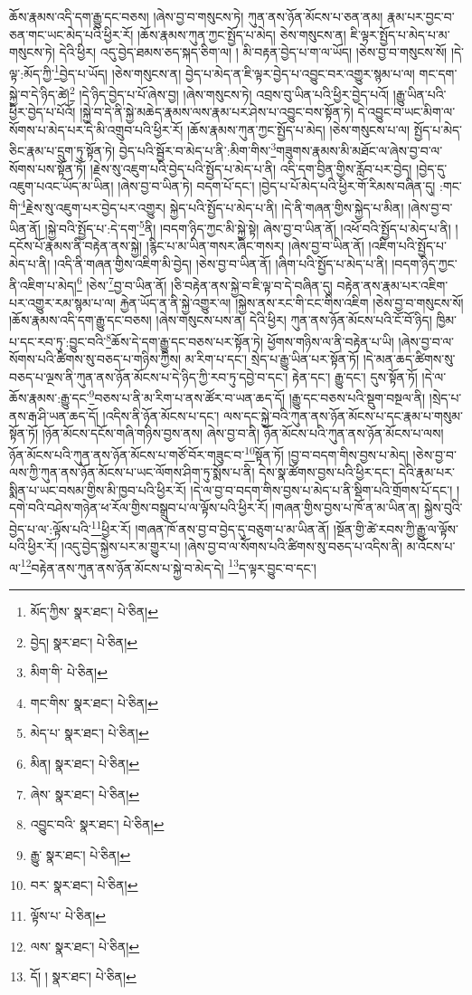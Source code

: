 ཆོས་རྣམས་འདི་དག་རྒྱུ་དང་བཅས། །ཞེས་བྱ་བ་གསུངས་ཏེ། ཀུན་ནས་ཉོན་མོངས་པ་ཅན་ནམ། རྣམ་པར་བྱང་བ་ཅན་གང་ཡང་མེད་པའི་ཕྱིར་རོ། །ཆོས་རྣམས་ཀུན་ཀྱང་སྤྱོད་པ་མེད། ཅེས་གསུངས་ན། ཇི་ལྟར་སྤྱོད་པ་མེད་པ་མ་གསུངས་ཏེ། དེའི་ཕྱིར། འདུ་བྱེད་ཐམས་ཅད་སྐད་ཅིག་ལ། །
མི་བརྟན་བྱེད་པ་ག་ལ་ཡོད། །ཅེས་བྱ་བ་གསུངས་སོ། །དེ་ལྟ་:མོད་ཀྱི་\footnote{མོད་ཀྱིས་  སྣར་ཐང་།  པེ་ཅིན། }བྱེད་པ་ཡོད། །ཅེས་གསུངས་ན། བྱེད་པ་མེད་ན་ཇི་ལྟར་བྱེད་པ་འབྱུང་བར་འགྱུར་སྙམ་པ་ལ། གང་དག་སྐྱེ་བ་དེ་ཉིད་ཚེ།\footnote{བྱེད།  སྣར་ཐང་།  པེ་ཅིན། } །དེ་ཉིད་བྱེད་པ་པོ་ཞེས་བྱ། །ཞེས་གསུངས་ཏེ། འབྲས་བུ་ཡིན་པའི་ཕྱིར་བྱེད་པའོ། །རྒྱུ་ཡིན་པའི་ཕྱིར་བྱེད་པ་པོའོ། །སྐྱེ་བ་དེ་ནི་སྐྱེ་མཆེད་རྣམས་ལས་རྣམ་པར་ཤེས་པ་འབྱུང་བས་སྟོན་ཏེ། དེ་འབྱུང་བ་ཡང་མིག་ལ་སོགས་པ་མེད་པར་དེ་མི་འགྲུབ་པའི་ཕྱིར་རོ། །ཆོས་རྣམས་ཀུན་ཀྱང་སྤྱོད་པ་མེད། །ཅེས་གསུངས་པ་ལ། སྤྱོད་པ་མེད་ཅིང་རྣམ་པ་དྲུག་ཏུ་སྟོན་ཏེ། བྱེད་པའི་སྦྱོར་བ་མེད་པ་ནི་:མིག་གིས་\footnote{མིག་གི་  པེ་ཅིན། }གཟུགས་རྣམས་མི་མཐོང་ལ་ཞེས་བྱ་བ་ལ་སོགས་པས་སྟོན་ཏོ། །རྗེས་སུ་འཇུག་པའི་བྱེད་པའི་སྤྱོད་པ་མེད་པ་ནི། འདི་དག་བྱིན་གྱིས་རློབ་པར་བྱེད། །བྱེད་དུ་འཇུག་པའང་ཡོད་མ་ཡིན། །ཞེས་བྱ་བ་ཡིན་ཏེ། བདག་པོ་དང་། །བྱེད་པ་པོ་མེད་པའི་ཕྱིར་གོ་རིམས་བཞིན་དུ། :གང་གི་\footnote{གང་གིས་  སྣར་ཐང་།  པེ་ཅིན། }རྗེས་སུ་འཇུག་པར་བྱེད་པར་འགྱུར། སྐྱེད་པའི་སྤྱོད་པ་མེད་པ་ནི། །དེ་ནི་གཞན་གྱིས་སྐྱེད་པ་མིན། །ཞེས་བྱ་བ་ཡིན་ནོ། །སྐྱེ་བའི་སྤྱོད་པ་:དེ་དག་\footnote{མེད་པ་  སྣར་ཐང་།  པེ་ཅིན། }ནི། །བདག་ཉིད་ཀྱང་མི་སྐྱེ་སྟེ། ཞེས་བྱ་བ་ཡིན་ནོ། །འཕོ་བའི་སྤྱོད་པ་མེད་པ་ནི། །དངོས་པོ་རྣམས་ནི་བརྟེན་ནས་སྐྱེ། །རྙིང་པ་མ་ཡིན་གསར་ཞིང་གསར། །ཞེས་བྱ་བ་ཡིན་ནོ། །འཇིག་པའི་སྤྱོད་པ་མེད་པ་ནི། །འདི་ནི་གཞན་གྱིས་འཇིག་མི་བྱེད། །ཅེས་བྱ་བ་ཡིན་ནོ། །ཞིག་པའི་སྤྱོད་པ་མེད་པ་ནི། །བདག་ཉིད་ཀྱང་ནི་འཇིག་པ་མེད།\footnote{མིན།  སྣར་ཐང་།  པེ་ཅིན། } །ཅེས་\footnote{ཞེས་  སྣར་ཐང་།  པེ་ཅིན། }བྱ་བ་ཡིན་ནོ། །ཅི་བརྟེན་ནས་སྐྱེ་བ་ཇི་ལྟ་བ་དེ་བཞིན་དུ། བརྟེན་ནས་རྣམ་པར་འཇིག་པར་འགྱུར་རམ་སྙམ་པ་ལ། རྐྱེན་ཡོད་ན་ནི་སྐྱེ་འགྱུར་ལ། །སྐྱེས་ནས་རང་གི་ངང་གིས་འཇིག །ཅེས་བྱ་བ་གསུངས་སོ། །ཆོས་རྣམས་འདི་དག་རྒྱུ་དང་བཅས། །ཞེས་གསུངས་པས་ན། དེའི་ཕྱིར། ཀུན་ནས་ཉོན་མོངས་པའི་ངོ་བོ་ཉིད། ཁྱིམ་པ་དང་རབ་ཏུ་:བྱུང་བའི་\footnote{འབྱུང་བའི་  སྣར་ཐང་།  པེ་ཅིན། }ཆོས་དེ་དག་རྒྱུ་དང་བཅས་པར་སྟོན་ཏེ། ཕྱོགས་གཉིས་ལ་ནི་བརྟེན་པ་ཡི། །ཞེས་བྱ་བ་ལ་སོགས་པའི་ཚིགས་སུ་བཅད་པ་གཉིས་ཀྱིས། མ་རིག་པ་དང་། སྲེད་པ་རྒྱུ་ཡིན་པར་སྟོན་ཏོ། །དེ་མན་ཆད་ཚིགས་སུ་བཅད་པ་ལྔས་ནི་ཀུན་ནས་ཉོན་མོངས་པ་དེ་ཉིད་ཀྱི་རབ་ཏུ་དབྱེ་བ་དང་། རྟེན་དང་། རྒྱུ་དང་། དུས་སྟོན་ཏོ། །དེ་ལ་ཆོས་རྣམས་:རྒྱུ་དང་\footnote{རྒྱུ་  སྣར་ཐང་།  པེ་ཅིན། }བཅས་པ་ནི་མ་རིག་པ་ནས་ཚོར་བ་ཡན་ཆད་དོ། །རྒྱུ་དང་བཅས་པའི་སྡུག་བསྔལ་ནི། །སྲེད་པ་ནས་རྒ་ཤི་ཡན་ཆད་དོ། །འདིས་ནི་ཉོན་མོངས་པ་དང་། ལས་དང་སྐྱེ་བའི་ཀུན་ནས་ཉོན་མོངས་པ་དང་རྣམ་པ་གསུམ་སྟོན་ཏོ། །ཉོན་མོངས་དངོས་གཞི་གཉིས་བྱས་ནས། ཞེས་བྱ་བ་ནི། ཉོན་མོངས་པའི་ཀུན་ནས་ཉོན་མོངས་པ་ལས། ཉོན་མོངས་པའི་ཀུན་ནས་ཉོན་མོངས་པ་གཙོ་བོར་གཟུང་བ་\footnote{བར་  སྣར་ཐང་།  པེ་ཅིན། }སྟོན་ཏོ། །བྱ་བ་བདག་གིས་བྱས་པ་མེད། །ཅེས་བྱ་བ་ལས་ཀྱི་ཀུན་ནས་ཉོན་མོངས་པ་ཡང་ལོགས་ཤིག་ཏུ་སྨོས་པ་ནི། དེས་སྣ་ཚོགས་བྱས་པའི་ཕྱིར་དང་། དེའི་རྣམ་པར་སྨིན་པ་ཡང་བསམ་གྱིས་མི་ཁྱབ་པའི་ཕྱིར་རོ། །དེ་ལ་བྱ་བ་བདག་གིས་བྱས་པ་མེད་པ་ནི་སྡིག་པའི་གྲོགས་པོ་དང་། །དགེ་བའི་བཤེས་གཉེན་ཕ་རོལ་གྱིས་བསྒྲུབ་པ་ལ་ལྟོས་པའི་ཕྱིར་རོ། །གཞན་གྱིས་བྱས་པ་ཁོ་ན་མ་ཡིན་ན། སྐྱེས་བུའི་བྱེད་པ་ལ་:ལྟོས་པའི་\footnote{ལྟོས་པ་  པེ་ཅིན། }ཕྱིར་རོ། །གཞན་ཁོ་ནས་བྱ་བ་བྱེད་དུ་བཅུག་པ་མ་ཡིན་ནོ། །སྔོན་གྱི་ཚེ་རབས་ཀྱི་རྒྱུ་ལ་ལྟོས་པའི་ཕྱིར་རོ། །འདུ་བྱེད་སྐྱེས་པར་མ་གྱུར་པ། །ཞེས་བྱ་བ་ལ་སོགས་པའི་ཚིགས་སུ་བཅད་པ་འདིས་ནི། མ་འོངས་པ་ལ་\footnote{ལས་  སྣར་ཐང་།  པེ་ཅིན། }བརྟེན་ནས་ཀུན་ནས་ཉོན་མོངས་པ་སྐྱེ་བ་མེད་དེ། \footnote{དོ། །   སྣར་ཐང་།  པེ་ཅིན། }ད་ལྟར་བྱུང་བ་དང་། 